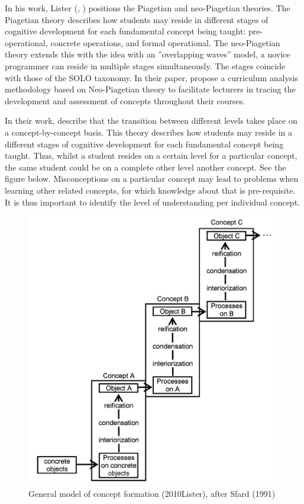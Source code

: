 In his work, Lister (\citeyear{lister2010naturally}, \citeyear{lister2016toward}) positions the Piagetian and neo-Piagetian theories. The Piagetian theory describes how students may reside in different stages of cognitive development for each fundamental concept being taught: pre-operational, concrete operations, and formal operational. The neo-Piagetian theory extends this with the idea with an ”overlapping waves” model, a novice programmer can reside in multiple stages simultaneously. The stages coincide with those of the SOLO taxonomy. In their paper,  propose a curriculum analysis methodology based on Neo-Piagetian theory to facilitate lecturers in tracing the development and assessment of concepts throughout their courses.

In their work,  describe that the transition between different levels takes place on a concept-by-concept basis. This theory describes how students may reside in a different stages of cognitive development for each fundamental concept being taught. Thus, whilst a student resides on a certain level for a particular concept, the same student could be on a complete other level another concept. See the figure below. Misconceptions on a particular concept may lead to problems when learning other related concepts, for which knowledge about that is pre-requisite. It is thus important to identify the level of understanding per individual concept.


\begin{figure}
\includegraphics[scale=0.8]{figures/ListerFases.png}
\caption{General model of concept formation (2010Lister), after Sfard (1991)}\label{fig:ListerFases}
\end{figure}


